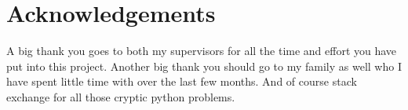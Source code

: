 \section{Acknowledgements}
A big thank you goes to both my supervisors for all the time and effort you have put into this project. Another big thank you should go to my family as well who I have spent little time with over the last few months. And of course stack exchange for all those cryptic python problems.